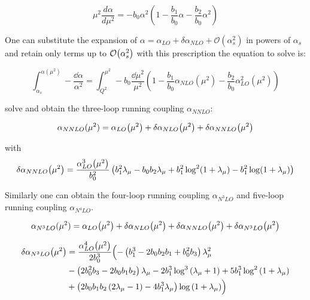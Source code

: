 \documentclass[../main.tex]{subfiles}
\begin{document}
\begin{equation}
    \mu^2 \frac{d\alpha}{d\mu^2} = - b_0 \alpha^2(1 - \frac{b_1}{b_0} \alpha - \frac{b_2}{b_0} \alpha^2)
\end{equation}

One can substitute the expansion of $\alpha= \alpha_{LO}+\delta\alpha_{NLO}+\mathcal{O}(\alpha_s^2)$ in powers of $\alpha_s$ 
and retain only terms up to $\order{\alpha_s^2}$ with this prescription the equation to solve is:

\begin{equation}
    \int_{\alpha_s}^{\alpha(\mu^2)} -\frac{\dd\alpha}{\alpha^2} = 
    \int _{Q^2}^{\mu^2} - b_0 \frac{ \dd\mu^2}{\mu^2} ( 1 - \frac{b_1}{b_0} \alpha_{NLO}(\mu^2) - \frac{b_2}{b_0} \alpha_{LO}^2(\mu^2) )
\end{equation}

solve and obtain the three-loop running coupling $\alpha_{NNLO}$:

\begin{equation}\label{eq:NNLO}
    \alpha_{NNLO}(\mu^2) = \alpha_{LO}\qty(\mu^2) + \delta\alpha_{NLO}\qty(\mu^2)+\delta\alpha_{NNLO}\qty(\mu^2)
\end{equation}

with 
\begin{equation}\label{eq:DNNLO}
    \delta\alpha_{NNLO}\qty(\mu^2) = \frac{\alpha_{LO}^3\qty(\mu^2)}{b_0^2}\left(b _1^2 \lambda_\mu -b_0 b_2 \lambda_\mu +b_1^2 \log ^2(1+\lambda_\mu )-b_1^2 \log (1+\lambda_\mu )\right)    
\end{equation}

Similarly one can obtain the four-loop running coupling $\alpha_{N^3LO}$ and five-loop running coupling $\alpha_{N^4LO}$.

\begin{equation}\label{eq:N3LO}
    \alpha_{N^3LO}(\mu^2) = \alpha_{LO}\qty(\mu^2) + \delta\alpha_{NLO}\qty(\mu^2)+\delta\alpha_{NNLO}\qty(\mu^2)+\delta\alpha_{N^3LO}\qty(\mu^2)
\end{equation}

\begin{equation}\label{eq:DN3LO}
    \begin{split}
        \delta\alpha_{N^3LO}\qty(\mu^2) &= \frac{\alpha_{LO}^4\qty(\mu^2)}{2 b_0^3} \Bigl(-\left(b_1^3-2 b_0 b_2 b_1+b_0^2 b_3\right) \lambda _{\mu }^2\\
        &-\left(2 b_0^2 b_3-2 b_0 b_1 b_2\right) \lambda _{\mu }-2 b_1^3 \log ^3\left(\lambda _{\mu }+1\right)+5 b_1^3 \log ^2\left(1+\lambda _{\mu }\right)\\
        &+\left(2 b_0 b_1 b_2 \left(2 \lambda _{\mu }-1\right)-4 b_1^3 \lambda _{\mu }\right) \log \left(1+\lambda _{\mu }\right)\Bigr)
    \end{split}
\end{equation}
\end{document}
